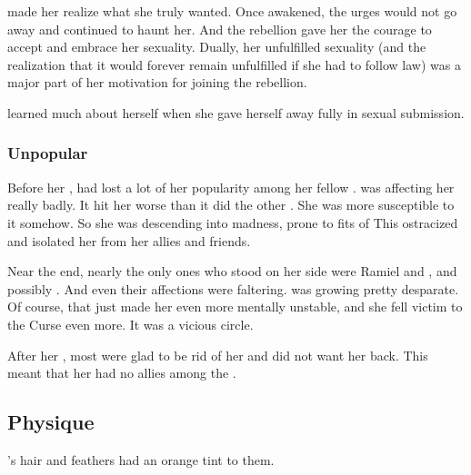 \Semiza{} made her realize what she truly wanted. 
Once awakened, the urges would not go away and continued to haunt her. 
And the rebellion gave her the courage to accept and embrace her sexuality. 
Dually, her unfulfilled sexuality (and the realization that it would forever remain unfulfilled if she had to follow \Merkyran{} law) was a major part of her motivation for joining the rebellion. 

\Shiaraid{} learned much about herself when she gave herself away fully in sexual submission. 






\subsubsection{Unpopular}
Before her \kenosis, \Shiaraid{} had lost a lot of her popularity among her fellow \resphain. 
 was affecting her really badly. 
It hit her worse than it did the other \satharioth. 
She was more susceptible to it somehow. 
So she was descending into madness, prone to fits of 
This ostracized and isolated her from her allies and friends. 

Near the end, nearly the only ones who stood on her side were Ramiel and \Eryal, and possibly \Cishiel. 
And even their affections were faltering. 
\Shiaraid{} was growing pretty desparate. 
Of course, that just made her even more mentally unstable, and she fell victim to the Curse even more. 
It was a vicious circle. 

After her \kenosis, most \resphain{} were glad to be rid of her and did not want her back. 
This meant that her  had no allies among the \resphain. 









\subsection{Physique}
\Shiaraid's hair and feathers had an orange tint to them. 










